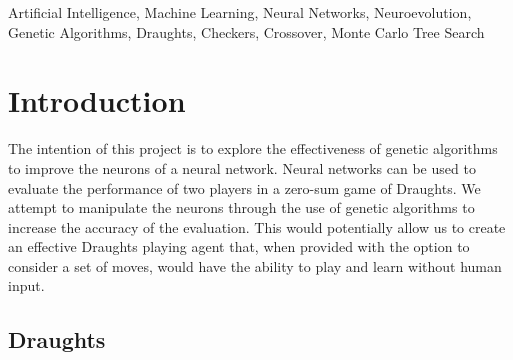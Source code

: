 \documentclass[12pt,a4paper]{article}
\begin{document}
\begin{abstract}
    {\bf Results}

    Overall, the neuroevolutionary approach has shown to learn and improve over time. The net learning rate was positive. However, the wide scope of the adjustments afforded may have impacted the learning rate and has consequently shown to be volatile in some situations. The use of crossovers may dramatically influence the quality of the learning.

    {\bf Conclusion}

    Under the premise that the fitness function is well defined, neuroevolution can be considered as an option to create a draughts playing AI. However, the robustness of the system is quite volatile. To counteract this, the system is  best paired with mutation and crossover methods that are not heavily reliant on entropy.

\end{abstract}
\begin{keywords}
    Artificial Intelligence, Machine Learning, Neural Networks, Neuroevolution, Genetic Algorithms, Draughts, Checkers, Crossover, Monte Carlo Tree Search
\end{keywords}
\section{Introduction}
    The intention of this project is to explore the effectiveness of genetic algorithms to improve the neurons of a neural network. Neural networks can be used to evaluate the performance of two players in a zero-sum game of Draughts. We attempt to manipulate the neurons through the use of genetic algorithms to increase the accuracy of the evaluation. This would potentially allow us to create an effective Draughts playing agent that, when provided with the option to consider a set of moves, would have the ability to play and learn without human input.

    \subsection{Draughts}
\end{document}
